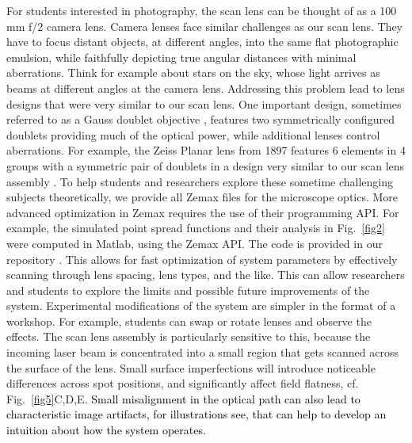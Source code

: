 \documentclass[10pt,letterpaper]{article}
\begin{document}
For students interested in photography, the scan lens can be thought of as a 100 mm f/2 camera lens. Camera lenses face similar challenges as our scan lens. They have to focus distant objects, at different angles, into the same flat photographic emulsion, while faithfully depicting true angular distances with minimal aberrations. Think for example about stars on the sky, whose light arrives as beams at different angles at the camera lens. Addressing this problem lead to lens designs that were very similar to our scan lens. One important design, sometimes referred to as a Gauss doublet objective \cite{Kidger2001}, features two symmetrically configured doublets providing much of the optical power, while additional lenses control aberrations. For example, the Zeiss Planar lens from 1897 features 6 elements in 4 groups with a symmetric pair of doublets in a design very similar to our scan lens assembly \cite{Rudolf1897}. To help students and researchers explore these sometime challenging subjects theoretically, we provide all Zemax files for the microscope optics. More advanced optimization in Zemax requires the use of their programming API. For example, the simulated point spread functions and their analysis in Fig.~\ref{fig2} were computed in Matlab, using the Zemax API. The code is provided in our repository \cite{Zenodo2024}. This allows for fast optimization of system parameters by effectively scanning through lens spacing, lens types, and the like. This can allow researchers and students to explore the limits and possible future improvements of the system. Experimental modifications of the system are simpler in the format of a workshop. For example, students can swap or rotate lenses and observe the effects. The scan lens assembly is particularly sensitive to this, because the incoming laser beam is concentrated into a small region that gets scanned across the surface of the lens. Small surface imperfections will introduce noticeable differences across spot positions, and significantly affect field flatness, cf. Fig.~\ref{fig5}C,D,E. \textcolor{black}{Small misalignment in the optical path can also lead to characteristic image artifacts, for illustrations see\cite{Corbett2014, Lees2024}, that can help to develop an intuition about how the system operates.}\newline
\end{document}
